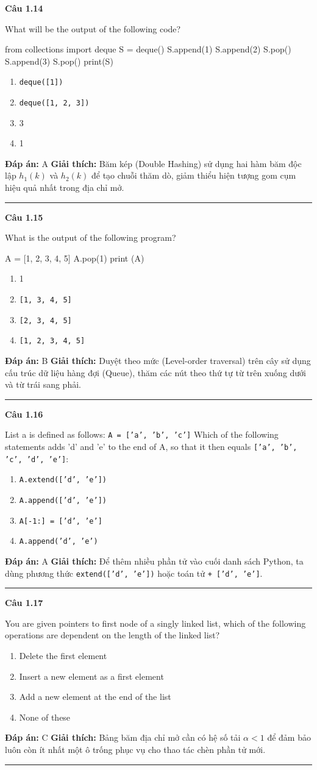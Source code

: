\documentclass[11pt,a4paper]{article}
\newenvironment{question}[1]{%
  \par\vspace{1em}\noindent\textbf{\large Câu #1}\par\vspace{0.4em}
}{%
  \par\vspace{1em}\hrule\vspace{0.6em}
}
\newenvironment{choices}{%
  \begin{enumerate}[label=\textbf{\Alph*.},leftmargin=2.2em,itemsep=2pt,topsep=3pt]
}{%
  \end{enumerate}
}
\newcommand{\choice}{\item}
\newenvironment{codebox}{%
  \begin{tcolorbox}[colback=gray!8!white,colframe=gray!50!black,arc=1.5mm,boxrule=0.6pt,left=3mm,right=3mm,top=2.5mm,bottom=2.5mm]
  \ttfamily\small
}{%
  \end{tcolorbox}
}
\begin{document}
\begin{question}{1.14}
What will be the output of the following code?
\begin{codebox}
from collections import deque
S = deque()
S.append(1)
S.append(2)
S.pop()
S.append(3)
S.pop()
print(S)
\end{codebox}
\begin{choices}
\choice \texttt{deque([1])}
\choice \texttt{deque([1, 2, 3])}
\choice 3
\choice 1
\end{choices}
\textbf{Đáp án:} A
\textbf{Giải thích:} Băm kép (Double Hashing) sử dụng hai hàm băm độc lập $h_1(k)$ và $h_2(k)$ để tạo chuỗi thăm dò, giảm thiểu hiện tượng gom cụm hiệu quả nhất trong địa chỉ mở.
\end{question}

\begin{question}{1.15}
What is the output of the following program?
\begin{codebox}
A = [1, 2, 3, 4, 5]
A.pop(1)
print (A)
\end{codebox}
\begin{choices}
\choice 1
\choice \texttt{[1, 3, 4, 5]}
\choice \texttt{[2, 3, 4, 5]}
\choice \texttt{[1, 2, 3, 4, 5]}
\end{choices}
\textbf{Đáp án:} B
\textbf{Giải thích:} Duyệt theo mức (Level-order traversal) trên cây sử dụng cấu trúc dữ liệu hàng đợi (Queue), thăm các nút theo thứ tự từ trên xuống dưới và từ trái sang phải.
\end{question}

\begin{question}{1.16}
List a is defined as follows: \texttt{A = ['a', 'b', 'c']} Which of the following statements adds 'd' and 'e' to the end of A, so that it then equals \texttt{['a', 'b', 'c', 'd', 'e']}:
\begin{choices}
\choice \texttt{A.extend(['d', 'e'])}
\choice \texttt{A.append(['d', 'e'])}
\choice \texttt{A[-1:] = ['d', 'e']}
\choice \texttt{A.append('d', 'e')}
\end{choices}
\textbf{Đáp án:} A
\textbf{Giải thích:} Để thêm nhiều phần tử vào cuối danh sách Python, ta dùng phương thức \texttt{extend(['d', 'e'])} hoặc toán tử \texttt{+ ['d', 'e']}.
\end{question}

\begin{question}{1.17}
You are given pointers to first node of a singly linked list, which of the following operations are dependent on the length of the linked list?
\begin{choices}
\choice Delete the first element
\choice Insert a new element as a first element
\choice Add a new element at the end of the list
\choice None of these
\end{choices}
\textbf{Đáp án:} C
\textbf{Giải thích:} Bảng băm địa chỉ mở cần có hệ số tải $\alpha < 1$ để đảm bảo luôn còn ít nhất một ô trống phục vụ cho thao tác chèn phần tử mới.
\end{question}
\end{document}
